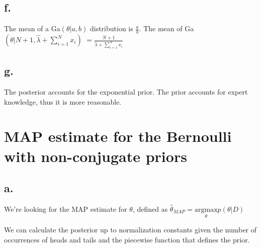 \documentclass{article}
\begin{document}
\subsection{f.}

The mean of a Ga$(\theta|a,b)$ distribution is $\frac{a}{b}$. The mean
of \mbox{Ga$(\theta|N+1, \hat{\lambda} + \sum_{i=1}^N x_i)$} $= \frac{N+1}{ \hat{\lambda} + \sum_{i=1}^N x_i}$

\subsection{g.}

The posterior accounts for the exponential prior. The prior accounts
for expert knowledge, thus it is more reasonable.

\section{MAP estimate for the Bernoulli with non-conjugate priors}

\subsection{a.}

We're looking for the MAP estimate for $\theta$, defined as $\hat{\theta}_{MAP} = \underset{\theta}{\mathrm{argmax}} p(\theta|D)$

We can calculate the posterior up to normalization constants given the
number of occurrences of heads and tails and the piecewise function
that defines the prior.
\end{document}
